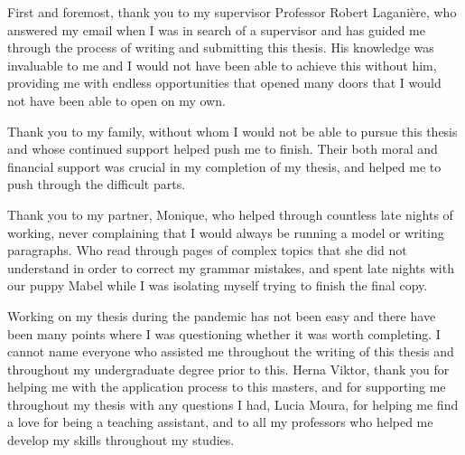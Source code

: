\documentclass[
11pt, %
oneside, %
english, %
doublespacing, %
nolistspacing, %
headsepline, %
]{MastersDoctoralThesis} %
\begin{document}
\begin{acknowledgements}
\addchaptertocentry{\acknowledgementname} %
First and foremost, thank you to my supervisor Professor Robert Laganière, who answered my email when I was in search of a supervisor and has guided me through the process of writing and submitting this thesis. His knowledge was invaluable to me and I would not have been able to achieve this without him, providing me with endless opportunities that opened many doors that I would not have been able to open on my own.

Thank you to my family, without whom I would not be able to pursue this thesis and whose continued support helped push me to finish. Their both moral and financial support was crucial in my completion of my thesis, and helped me to push through the difficult parts.

Thank you to my partner, Monique, who helped through countless late nights of working, never complaining that I would always be running a model or writing paragraphs. Who read through pages of complex topics that she did not understand in order to  correct my grammar mistakes, and spent late nights with our puppy Mabel while I was isolating myself trying to finish the final copy.

Working on my thesis during the pandemic has not been easy and there have been many points where I was questioning whether it was worth completing. I cannot name everyone who assisted me throughout the writing of this thesis and throughout my undergraduate degree prior to this. Herna Viktor, thank you for helping me with the application process to this masters, and for supporting me throughout my thesis with any questions I had, Lucia Moura, for helping me find a love for being a teaching assistant, and to all my professors who helped me develop my skills throughout my studies.
\end{acknowledgements}


\tableofcontents %

\listoffigures %

\listoftables %

\end{document}
